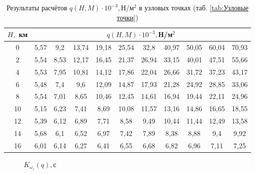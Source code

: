 \begin{table}[H]
    \centering
    \caption{Результаты расчётов $q(H,M) \cdot 10^{-3},$Н/м$^2$ в узловых точках (таб. \ref{tab:Узловые точки})}
    \label{tab:Результаты расчётов $q(H,M),$Н/м$^2$}
    \begin{tabular}{|c|c|c|c|c|c|c|c|c|c|c|}
    \hline
        $H,$ км &\multicolumn{10}{|c|}{$q(H,M) \cdot 10^{-3},$Н/м$^2$ }\\ \hline
        0 & 5,57 & 9,2 & 13,74 & 19,18 & 25,54 & 32,8 & 40,97 & 50,05 & 60,04 & 70,93  \\ \hline
        2 & 5,54 & 8,53 & 12,17 & 16,45 & 21,37 & 26,94 & 33,15 & 40,01 & 47,51 & 55,66  \\ \hline
        4 & 5,53 & 7,95 & 10,81 & 14,12 & 17,86 & 22,04 & 26,66 & 31,72 & 37,23 & 43,17  \\ \hline
        6 & 5,48 & 7,4 & 9,6 & 12,09 & 14,87 & 17,93 & 21,28 & 24,92 & 28,85 & 33,06  \\ \hline
        8 & 5,54 & 7,01 & 8,65 & 10,46 & 12,45 & 14,61 & 16,94 & 19,44 & 22,11 & 24,96  \\ \hline
        10 & 5,15 & 6,23 & 7,41 & 8,69 & 10,08 & 11,57 & 13,16 & 14,86 & 16,65 & 18,55  \\ \hline
        12 & 5,39 & 6,12 & 6,89 & 7,71 & 8,58 & 9,49 & 10,44 & 11,44 & 12,49 & 13,58  \\ \hline
        14 & 5,68 & 6,1 & 6,52 & 6,97 & 7,42 & 7,89 & 8,38 & 8,88 & 9,4 & 9,92  \\ \hline
        16 & 6,01 & 6,14 & 6,27 & 6,41 & 6,55 & 6,68 & 6,82 & 6,96 & 7,11 & 7,25  \\ \hline
    \end{tabular}
\end{table}
    
    \begin{figure}[H]
        \caption{$K_{\omega_z}(q), $с}
        \label{fig:K_wz}
    \end{figure}
    
